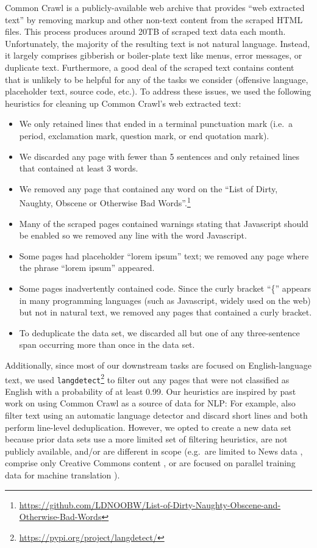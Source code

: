 \documentclass[twoside,11pt]{article}
\begin{document}
Common Crawl is a publicly-available web archive that provides ``web extracted text'' by removing markup and other non-text content from the scraped HTML files.
This process produces around 20TB of scraped text data each month.
Unfortunately, the majority of the resulting text is not natural language.
Instead, it largely comprises gibberish or boiler-plate text like menus, error messages, or duplicate text.
Furthermore, a good deal of the scraped text contains content that is unlikely to be helpful for any of the tasks we consider (offensive language, placeholder text, source code, etc.).
To address these issues, we used the following heuristics for cleaning up Common Crawl's web extracted text:
\begin{itemize}
  \item We only retained lines that ended in a terminal punctuation mark (i.e.\ a period, exclamation mark, question mark, or end quotation mark).
  \item We discarded any page with fewer than 5 sentences and only retained lines that contained at least 3 words.
  \item We removed any page that contained any word on the ``List of Dirty, Naughty, Obscene or Otherwise Bad Words''.\footnote{\url{https://github.com/LDNOOBW/List-of-Dirty-Naughty-Obscene-and-Otherwise-Bad-Words}}
  \item Many of the scraped pages contained warnings stating that Javascript should be enabled so we removed any line with the word Javascript.
  \item Some pages had placeholder ``lorem ipsum'' text; we removed any page where the phrase ``lorem ipsum'' appeared.
  \item Some pages inadvertently contained code. Since the curly bracket ``\{'' appears in many programming languages (such as Javascript, widely used on the web) but not in natural text, we removed any pages that contained a curly bracket.
  \item To deduplicate the data set, we discarded all but one of any three-sentence span occurring more than once in the data set.
\end{itemize}
Additionally, since most of our downstream tasks are focused on English-language text, we used \texttt{langdetect}\footnote{\url{https://pypi.org/project/langdetect/}} to filter out any pages that were not classified as English with a probability of at least 0.99.
Our heuristics are inspired by past work on using Common Crawl as a source of data for NLP:
For example, \citet{grave2018learning} also filter text using an automatic language detector and discard short lines and \citet{smith2013dirt,grave2018learning} both perform line-level deduplication.
However, we opted to create a new data set because prior data sets use a more limited set of filtering heuristics, are not publicly available, and/or are different in scope (e.g.\ are limited to News data \citep{zellers2019defending,liu2019roberta}, comprise only Creative Commons content \citep{habernal2016c4corpus}, or are focused on parallel training data for machine translation \citep{smith2013dirt}).
\end{document}
